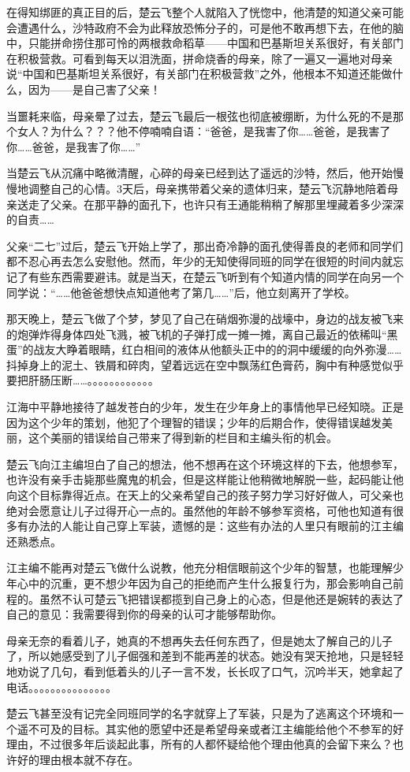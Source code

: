 在得知绑匪的真正目的后，楚云飞整个人就陷入了恍惚中，他清楚的知道父亲可能会遭遇什么，沙特政府不会为此释放恐怖分子的，可是他不敢再想下去，在他的脑中，只能拼命捞住那可怜的两根救命稻草——中国和巴基斯坦关系很好，有关部门在积极营救。可看到每天以泪洗面，拼命烧香的母亲，除了一遍又一遍地对母亲说“中国和巴基斯坦关系很好，有关部门在积极营救”之外，他根本不知道还能做什么，因为——是自己害了父亲！

当噩耗来临，母亲晕了过去，楚云飞最后一根弦也彻底被绷断，为什么死的不是那个女人？为什么？？？他不停喃喃自语：“爸爸，是我害了你……爸爸，是我害了你……爸爸，是我害了你……”

当楚云飞从沉痛中略微清醒，心碎的母亲已经到达了遥远的沙特，然后，他开始慢慢地调整自己的心情。3天后，母亲携带着父亲的遗体归来，楚云飞沉静地陪着母亲送走了父亲。在那平静的面孔下，也许只有王通能稍稍了解那里埋藏着多少深深的自责……

父亲“二七”过后，楚云飞开始上学了，那出奇冷静的面孔使得善良的老师和同学们都不忍心再去怎么安慰他。然而，年少的无知使得同班的同学在很短的时间内就忘记了有些东西需要避讳。就是当天，在楚云飞听到有个知道内情的同学在向另一个同学说：“……他爸爸想快点知道他考了第几……”后，他立刻离开了学校。

那天晚上，楚云飞做了个梦，梦见了自己在硝烟弥漫的战壕中，身边的战友被飞来的炮弹炸得身体四处飞溅，被飞机的子弹打成一摊一摊，离自己最近的依稀叫“黑蛋”的战友大睁着眼睛，红白相间的液体从他额头正中的的洞中缓缓的向外弥漫……抖掉身上的泥土、铁屑和碎肉，望着远远在空中飘荡红色膏药，胸中有种感觉似乎要把肝肠压断……。。。。。。。。。。。。

江海中平静地接待了越发苍白的少年，发生在少年身上的事情他早已经知晓。正是因为这个少年的策划，他犯了个理智的错误；少年的后期合作，使得错误越发美丽，这个美丽的错误给自己带来了得到新的栏目和主编头衔的机会。

楚云飞向江主编坦白了自己的想法，他不想再在这个环境这样的下去，他想参军，也许没有亲手击毙那些魔鬼的机会，但是这样能让他稍微地解脱一些，起码能让他向这个目标靠得近点。在天上的父亲希望自己的孩子努力学习好好做人，可父亲也绝对会愿意让儿子过得开心一点的。虽然他的年龄不够参军资格，可他也知道有很多有办法的人能让自己穿上军装，遗憾的是：这些有办法的人里只有眼前的江主编还熟悉点。

江主编不能再对楚云飞做什么说教，他充分相信眼前这个少年的智慧，也能理解少年心中的沉重，更不想少年因为自己的拒绝而产生什么报复行为，那会影响自己前程的。虽然不认可楚云飞把错误都揽到自己身上的心态，但是他还是婉转的表达了自己的意见：我需要得到你的母亲的认可才能够帮助你。

母亲无奈的看着儿子，她真的不想再失去任何东西了，但是她太了解自己的儿子了，所以她感受到了儿子倔强和差到不能再差的状态。她没有哭天抢地，只是轻轻地劝说了几句，看到低着头的儿子一言不发，长长叹了口气，沉吟半天，她拿起了电话。。。。。。。。。。。。。。。

楚云飞甚至没有记完全同班同学的名字就穿上了军装，只是为了逃离这个环境和一个遥不可及的目标。其实他的愿望中还是希望母亲或者江主编能给他个不参军的好理由，不过很多年后谈起此事，所有的人都怀疑给他个理由他真的会留下来么？也许好的理由根本就不存在。

